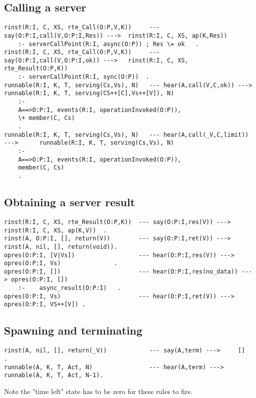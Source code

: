 \subsection{Calling a server}

\begin{verbatim}
rinst(R:I, C, XS, rte_Call(O:P,V,K))     --- say(O:P:I,call(V,O:P:I,Res)) --->  rinst(R:I, C, XS, ap(K,Res))
    :- serverCallPoint(R:I, async(O:P)) ; Res \= ok   .
rinst(R:I, C, XS, rte_Call(O:P,V,K))     --- say(O:P:I,call(V,O:P:I,ok)) --->   rinst(R:I, C, XS, rte_Result(O:P,K))
    :- serverCallPoint(R:I, sync(O:P))  .
runnable(R:I, K, T, serving(Cs,Vs), N)   --- hear(A,call(V,C,ok)) --->          runnable(R:I, K, T, serving(CS++[C],Vs++[V]), N)
    :-
    A==>O:P:I, events(R:I, operationInvoked(O:P)),
    \+ member(C, Cs)
    .
runnable(R:I, K, T, serving(Cs,Vs), N)   --- hear(A,call(_V,C,limit)) --->      runnable(R:I, K, T, serving(Cs,Vs), N)
    :-
    A==>O:P:I, events(R:I, operationInvoked(O:P)),
    member(C, Cs)
    .
\end{verbatim}

\subsection{Obtaining a server result}

\begin{verbatim}
rinst(R:I, C, XS, rte_Result(O:P,K))  --- say(O:P:I,res(V)) --->        rinst(R:I, C, XS, ap(K,V))  .
rinst(A, O:P:I, [], return(V))        --- say(O:P:I,ret(V)) --->        rinst(A, nil, [], return(void)).
opres(O:P:I, [V|Vs])                  --- hear(O:P:I,res(V)) --->       opres(O:P:I, Vs)               .
opres(O:P:I, [])                      --- hear(O:P:I,res(no_data)) ---> opres(O:P:I, [])
    :-    async_result(O:P:I)   .
opres(O:P:I, Vs)                      --- hear(O:P:I,ret(V)) --->       opres(O:P:I, VS++[V]) .
\end{verbatim}

\subsection{Spawning and terminating}

\begin{verbatim}
rinst(A, nil, [], return(_V))            --- say(A,term) --->     []    .
runnable(A, K, T, Act, N)                --- hear(A,term) --->    runnable(A, K, T, Act, N-1).
\end{verbatim}
Note the "time left" state has to be zero for these rules to fire.

